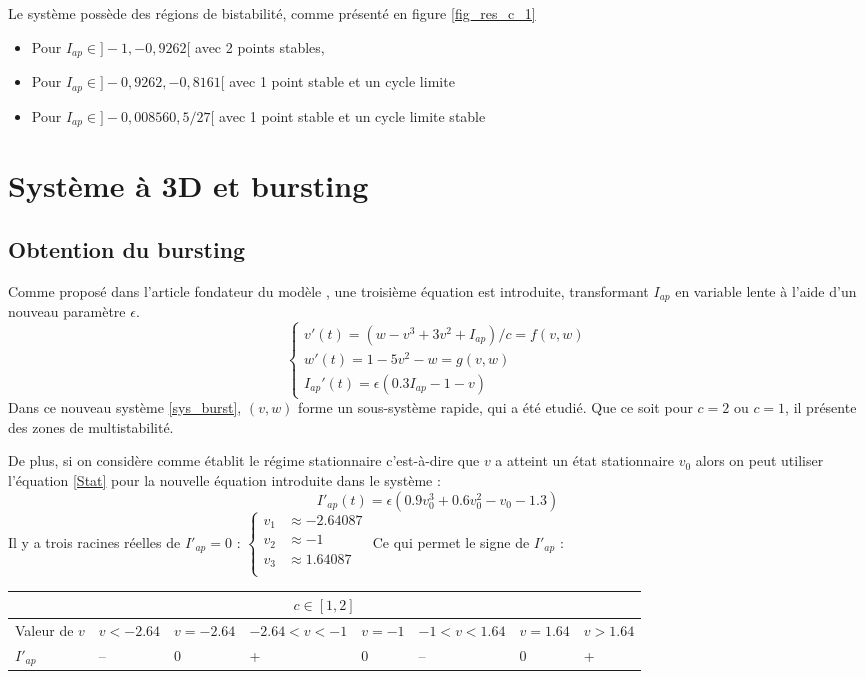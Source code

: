 \documentclass[12pt,a4paper,onecolumn]{article}
\begin{document}
Le système possède des régions de bistabilité, comme présenté en figure \ref{fig_res_c_1}
\begin{itemize}
\item Pour $I_{ap} \in ]-1, -0,9262[$ avec 2 points stables,
\item Pour $I_{ap} \in ]-0,9262, -0,8161[$ avec 1 point stable et un cycle limite
\item Pour  $I_{ap} \in ] -0,008560, 5/27[$ avec 1 point stable et un cycle limite stable
\end{itemize}

\section{Système à 3D et bursting}
\subsection{Obtention du bursting}
Comme proposé dans l'article fondateur du modèle \cite{hindmarsh1984model}, une troisième équation est introduite, transformant $I_{ap}$ en variable lente à l'aide d'un nouveau paramètre $\epsilon$.
\begin{equation}
\left\{
\begin{array}{l }
v'(t)= (w - v^3 + 3v^2 +I_{ap})/c = f(v,w) \\
w'(t) = 1 - 5 v^2 - w = g(v,w)  \\
I_{ap}'(t)= \epsilon (0.3 I_{ap} -1 -v)
\end{array}
\right.
\label{sys_burst}
\end{equation}
Dans ce nouveau système \ref{sys_burst}, $(v, w)$ forme un sous-système rapide, qui a été etudié. Que ce soit pour $c=2$ ou $c=1$, il présente des zones de multistabilité.

De plus, si on considère comme établit le régime stationnaire c'est-à-dire que $v$ a atteint un état stationnaire $v_0$ alors on peut utiliser l'équation \ref{Stat} pour la nouvelle équation introduite dans le système :
$$
I'_{ap}(t) = \epsilon(0.9v_0^3+0.6v_0^2-v_0-1.3)
$$
Il y a trois racines réelles de $I'_{ap} = 0$ :
$\left\{
\begin{array}{rl}
v_1 &\approx -2.64087\\
v_2 &\approx -1\\
v_3 &\approx 1.64087\\
\end{array}
\right.$
Ce qui permet le signe de $I'_{ap}$ :
\begin{center}
	\begin{tabular}{|L{2.2cm} | C{1.5cm} | C{1.5cm} | C{1.5cm} |C{1.5cm}|C{1.5cm}|C{1.5cm}|C{1.5cm}|}
	\hline
	\\\hline
	Valeur de $v$ & $v < -2.64$ & $v = -2.64$ & $ -2.64 < v < -1$ & $v = -1$ & $-1 < v < 1.64$ & $v=1.64$ & $v > 1.64$ \\
	 \hline
	$I'_{ap}$ & -- & 0 & + & 0 & -- & 0 & +\\ \hline
	\end{tabular}
\end{center}
\end{document}
